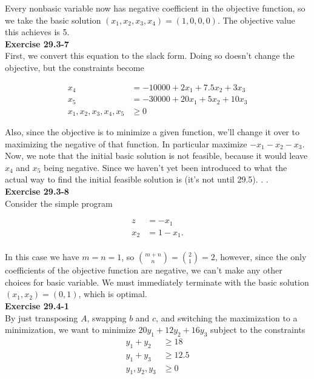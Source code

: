 \documentclass{article}
\begin{document}
Every nonbasic variable now has negative coefficient in the objective function, so we take the basic solution $(x_1,x_2,x_3,x_4) = (1,0,0,0)$. The objective value this achieves is 5. \\


\noindent\textbf{Exercise 29.3-7}\\

First, we convert this equation to the slack form. Doing so doesn't change the objective, but the constraints become

\begin{align*}
x_4 & = -10000 + 2x_1 + 7.5x_2 + 3x_3\\
x_5 & = -30000 + 20x_1 + 5x_2 + 10x_3 \\
x_1,x_2,x_3,x_4,x_5 &\ge 0
\end{align*}

Also, since the objective is to minimize a given function, we'll change it over to maximizing the negative of that function. In particular maximize $-x_1 -x_2 -x_3$. Now, we note that the initial basic solution is not feasible, because it would leave $x_4$ and $x_5$ being negative. Since we haven't yet been introduced to what the actual way to find the initial feasible solution is (it's not until 29.5). . . \\

\noindent\textbf{Exercise 29.3-8}\\

Consider the simple program

\begin{align*}
z &= -x_1\\
x_2 &= 1 - x_1. \\
\end{align*}

In this case we have $m = n = 1$, so ${m+n \choose n} = {2 \choose 1} = 2$, however, since the only coefficients of the objective function are negative, we can't make any other choices for basic variable.  We must immediately terminate with the basic solution $(x_1,x_2) = (0,1)$, which is optimal. \\

\noindent\textbf{Exercise 29.4-1}\\

By just transposing $A$, swapping $b$ and $c$, and switching the maximization to a minimization, we want to minimize $20y_1 + 12 y_2 + 16 y_3$ subject to the constraints 
\begin{align*}
y_1 + y_2 &\ge 18\\
y_1 + y_3 &\ge 12.5\\
y_1,y_2,y_3 &\ge 0
\end{align*}
\end{document}
